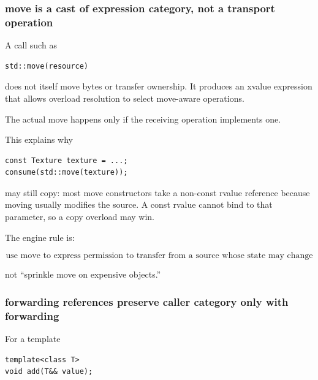 \subsubsection{move is a cast of expression category, not a transport operation}\label{01-foundations-i-ch005-move-is-a-cast-of-expression-category-not-a-transport-operation}

\hypertarget{01-foundations-i-ch005-move-is-a-cast-of-expression-category-not-a-transport-operation}{}

A call such as

\begin{verbatim}
std::move(resource)
\end{verbatim}

does not itself move bytes or transfer ownership. It produces an xvalue expression that allows overload resolution to select move-aware operations.

The actual move happens only if the receiving operation implements one.

This explains why

\begin{verbatim}
const Texture texture = ...;
consume(std::move(texture));
\end{verbatim}

may still copy: most move constructors take a non-const rvalue reference because moving usually modifies the source. A const rvalue cannot bind to that parameter, so a copy overload may win.

The engine rule is:

\[
\boxed{
\text{use move to express permission to transfer from a source whose state may change}
}
\]

not ``sprinkle move on expensive objects.''

\subsubsection{forwarding references preserve caller category only with forwarding}\label{01-foundations-i-ch005-forwarding-references-preserve-caller-category-only-with-forwarding}

\hypertarget{01-foundations-i-ch005-forwarding-references-preserve-caller-category-only-with-forwarding}{}

For a template

\begin{verbatim}
template<class T>
void add(T&& value);
\end{verbatim}

